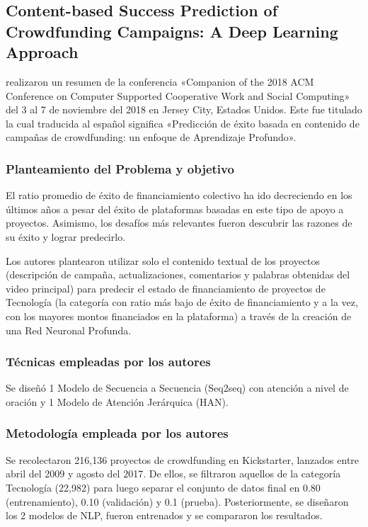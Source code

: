 \subsection{Content-based Success Prediction of Crowdfunding Campaigns: A Deep Learning Approach \citep*{pr_lee2018contentDL}}
\citeauthor{pr_lee2018contentDL} realizaron un resumen de la conferencia «Companion of the 2018 ACM Conference on Computer Supported Cooperative Work and Social Computing» del 3 al 7 de noviembre del 2018 en Jersey City, Estados Unidos. Este fue titulado  la cual traducida al español significa «Predicción de éxito basada en contenido de campañas de crowdfunding: un enfoque de Aprendizaje Profundo».

\subsubsection{Planteamiento del Problema y objetivo}
El ratio promedio de éxito de financiamiento colectivo ha ido decreciendo en los últimos años a pesar del éxito de plataformas basadas en este tipo de apoyo a proyectos. Asimismo, los desafíos más relevantes fueron descubrir las razones de su éxito y lograr predecirlo.

Los autores plantearon utilizar solo el contenido textual de los proyectos (descripción de campaña, actualizaciones, comentarios y palabras obtenidas del video principal) para predecir el estado de financiamiento de proyectos de Tecnología (la categoría con ratio más bajo de éxito de financiamiento y a la vez, con los mayores montos financiados en la plataforma) a través de la creación de una Red Neuronal Profunda.

\subsubsection{Técnicas empleadas por los autores}
Se diseñó 1 Modelo de Secuencia a Secuencia (Seq2seq) con atención a nivel de oración y 1 Modelo de Atención Jerárquica (HAN).

\subsubsection{Metodología empleada por los autores}
Se recolectaron 216,136 proyectos de crowdfunding en Kickstarter, lanzados entre abril del 2009 y agosto del 2017. De ellos, se filtraron aquellos de la categoría Tecnología (22,982) para luego separar el conjunto de datos final en 0.80 (entrenamiento), 0.10 (validación) y 0.1 (prueba). Posteriormente, se diseñaron los 2 modelos de NLP, fueron entrenados y se compararon los resultados.

